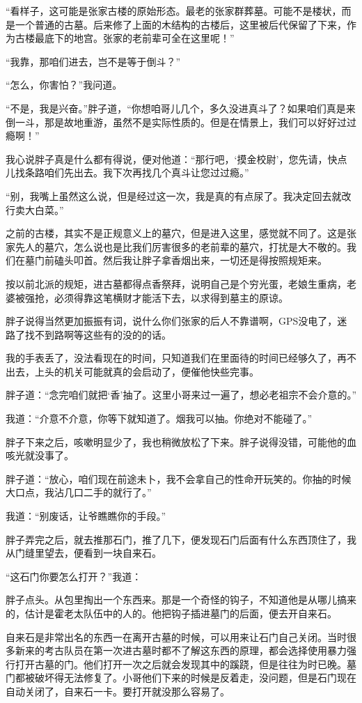 “看样子，这可能是张家古楼的原始形态。最老的张家群葬墓。可能不是楼状，而是一个普通的古墓。后来修了上面的木结构的古楼后，这里被后代保留了下来，作为古楼最底下的地宫。张家的老前辈可全在这里呢！”

“我靠，那咱们进去，岂不是等于倒斗？”

“怎么，你害怕？”我问道。

“不是，我是兴奋。”胖子道，“你想咱哥儿几个，多久没进真斗了？如果咱们真是来倒一斗，那是故地重游，虽然不是实际性质的。但是在情景上，我们可以好好过过瘾啊！”

我心说胖子真是什么都有得说，便对他道：“那行吧，‘摸金校尉’，您先请，快点儿找条路咱们先出去。我下次再找几个真斗让您过过瘾。”

“别，我嘴上虽然这么说，但是经过这一次，我是真的有点尿了。我决定回去就改行卖大白菜。”

之前的古楼，其实不是正规意义上的墓穴，但是进入这里，感觉就不同了。这是张家先人的墓穴，怎么说也是比我们厉害很多的老前辈的墓穴，打扰是大不敬的。我们在墓门前磕头叩首。然后我让胖子拿香烟出来，一切还是得按照规矩来。

按以前北派的规矩，进古墓都得点香祭拜，说明自己是个穷光蛋，老娘生重病，老婆被强抢，必须得靠这笔横财才能活下去，以求得到墓主的原谅。

胖子说得当然更加振振有词，说什么你们张家的后人不靠谱啊，GPS没电了，迷路了找不到路啊等这些有的没的的话。

我的手表丢了，没法看现在的时间，只知道我们在里面待的时间已经够久了，再不出去，上头的机关可能就真的会启动了，便催他快些完事。

胖子道：“念完咱们就把‘香’抽了。这里小哥来过一遍了，想必老祖宗不会介意的。”

我道：“介意不介意，你等下就知道了。烟我可以抽。你绝对不能碰了。”

胖子下来之后，咳嗽明显少了，我也稍微放松了下来。胖子说得没错，可能他的血咳光就没事了。

胖子道：“放心，咱们现在前途未卜，我不会拿自己的性命开玩笑的。你抽的时候大口点，我沾几口二手的就行了。”

我道：“别废话，让爷瞧瞧你的手段。”

胖子弄完之后，就去推那石门，推了几下，便发现石门后面有什么东西顶住了，我从门缝里望去，便看到一块自来石。

“这石门你要怎么打开？”我道：

胖子点头。从包里掏出一个东西来。那是一个奇怪的钩子，不知道他是从哪儿搞来的，估计是霍老太队伍中的人的。他把钩子插进墓门的后面，便去开自来石。

自来石是非常出名的东西一在离开古墓的时候，可以用来让石门自己关闭。当时很多新来的考古队员在第一次进古墓时都不了解这东西的原理，都会选择使用暴力强行打开古墓的门。他们打开一次之后就会发现其中的蹊跷，但是往往为时已晚。墓门都被破坏得无法修复了。小哥他们下来的时候是反着走，没问题，但是石门现在自动关闭了，自来石一卡。要打开就没那么容易了。

